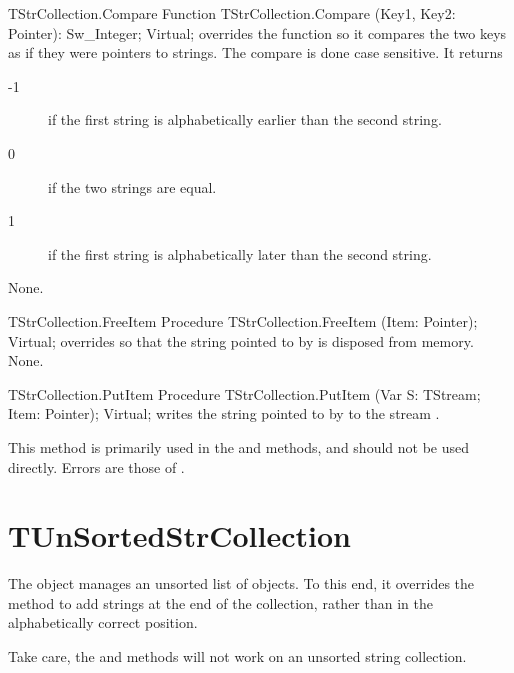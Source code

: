 \begin{function}{TStrCollection.Compare}
\Declaration
Function TStrCollection.Compare (Key1, Key2: Pointer): Sw\_Integer; Virtual;
\Description
{} overrides the  function so it compares 
the two keys as if they were pointers to strings. The compare is done case
sensitive. It returns
\begin{description}
\item[-1] if the first string is alphabetically earlier  than the second
string.
\item[0] if the two strings are equal.
\item[1] if the first string is alphabetically later than the second string.
\end{description}
\Errors
None.
\SeeAlso
{}
\end{function}

\begin{procedure}{TStrCollection.FreeItem}
\Declaration
Procedure TStrCollection.FreeItem (Item: Pointer); Virtual;
\Description
{} overrides  so that the string pointed
to by  is disposed from memory.
\Errors
None.
\SeeAlso
{}
\end{procedure}

\begin{procedure}{TStrCollection.PutItem}
\Declaration
Procedure TStrCollection.PutItem (Var S: TStream; Item: Pointer); Virtual;
\Description
{} writes the string pointed to by  to the stream
. 

This method is primarily used in the  and  methods, 
and should not be used directly.
\Errors
Errors are those of .
\SeeAlso
{}
\end{procedure}

\section{TUnSortedStrCollection}
\label{se:TUnSortedStrCollection}

The  object manages an unsorted list of objects.
To this end, it overrides the  method to add
strings at the end of the collection, rather than in the alphabetically
correct position.

Take care, the  and
 methods will not work on an unsorted
string collection.

